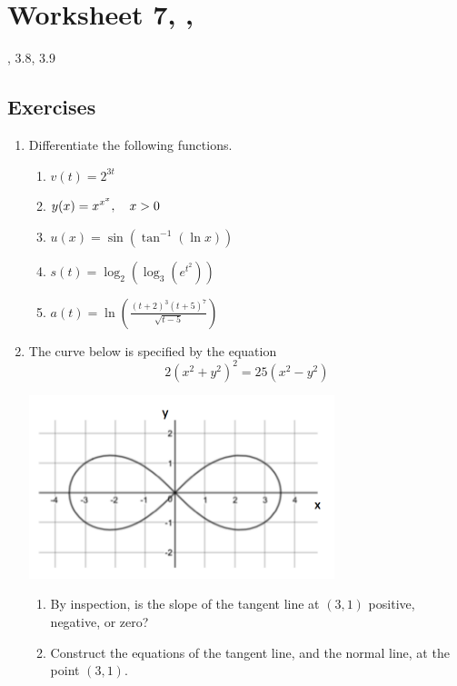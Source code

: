 \newpage\section*{Worksheet 7, \Course, \Semester} 
\noindent {}, 3.8, 3.9

\subsection*{Exercises}

\begin{enumerate}
	\item Differentiate the following functions. 
    \begin{enumerate}
    	\item $\displaystyle v(t) = 2^{3t}$
    	\item $\displaystyle y(x) = {\large x^{x^{x}}}, \quad x > 0$
        \item $\displaystyle u(x) = \sin\left(\tan^{-1} (\ln x)\right)$
        
        \item $\displaystyle s(t) = \log_2\left(\log_3\left(e^{t^2}\right)\right)$
        \item $\displaystyle a(t) = \ln\left(\frac{(t+2)^3(t+5)^7}{\sqrt{t-5}}\right)$
    \end{enumerate}
    \item The curve below is specified by the equation $$2\left(x^2+y^2\right)^2=25\left(x^2-y^2\right)$$
    
    \begin{center}
		\includegraphics[width=0.7\textwidth]{images/imgWS7Implicit.png} 
    \end{center}
    
    
    
    
    \begin{enumerate}
    	\item By inspection, is the slope of the tangent line at $(3,1)$ positive, negative, or zero? 
        \item Construct the equations of the tangent line, and the normal line, at the point $(3,1)$. 
\end{enumerate}
\end{enumerate}